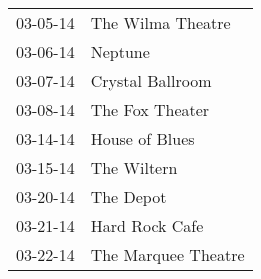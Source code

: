 \begin{supertabular}{p{0.25\columnwidth}p{0.75\columnwidth}}
 03-05-14 &    The Wilma Theatre \\
 03-06-14 &              Neptune \\
 03-07-14 &     Crystal Ballroom \\
 03-08-14 &      The Fox Theater \\
 03-14-14 &       House of Blues \\
 03-15-14 &          The Wiltern \\
 03-20-14 &            The Depot \\
 03-21-14 &       Hard Rock Cafe \\
 03-22-14 &  The Marquee Theatre \\
\end{supertabular}
